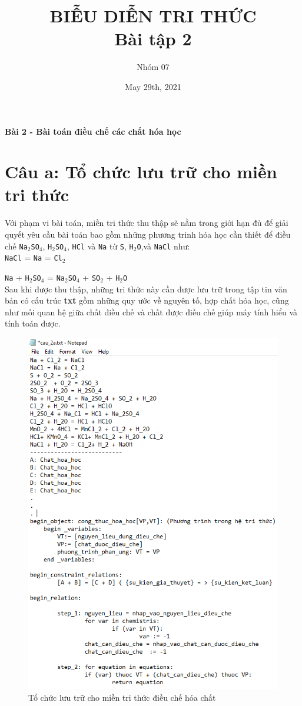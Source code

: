 \documentclass[a4paper]{article}
\title{BIỄU DIỄN TRI THỨC\\ Bài tập 2}
\author{Nhóm 07}
\date{May 29th, 2021}
\begin{document}
	\maketitle
	\begin{center}
		\Large{\textbf{Bài 2 - Bài toán điều chế các chất hóa học}}
	\end{center}
	\section*{Câu a: Tổ chức lưu trữ cho miền tri thức} 
	
	Với phạm vi bài toán, miền tri thức thu thập sẽ nằm trong giới hạn đủ để giải quyết yêu cầu bài toán bao gồm những phương trinh hóa học cần thiết để điều chế \texttt{Na$_2$SO$_4$}, \texttt{H$_2$SO$_4$}, \texttt{HCl} và \texttt{Na} từ \texttt{S}, \texttt{H$_2$O},và \texttt{NaCl} như:\\
	
	
	\texttt{NaCl} = \texttt{Na} = \texttt{Cl$_2$}  
	
	
	\texttt{Na} + \texttt{H$_2$SO$_4$} = \texttt{Na$_2$SO$_4$} + \texttt{SO$_2$} + \texttt{H$_2$O}\\
	
	Sau khi được thu thập, những tri thức này cần được lưu trữ trong tập tin văn bản có cấu trúc \textbf{txt} gồm những quy ước về nguyên tố, hợp chất hóa học, cũng như mối quan hệ giữa chất điều chế và chất được điều chế giúp máy tính hiểu và tính toán được.
		
	\begin{figure}[h]
	\centering
	\includegraphics[width=.46\linewidth]{2a_luutru.PNG}  
	\caption{Tổ chức lưu trữ cho miền tri thức điều chế hóa chất}
	\label{}
	\end{figure}
\end{document}
